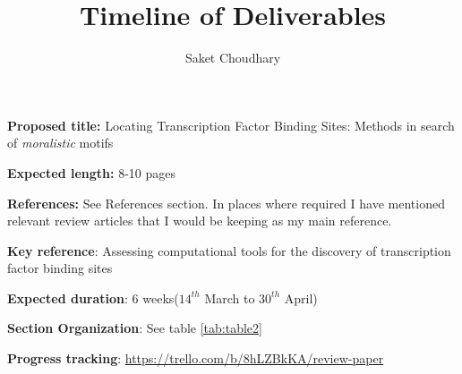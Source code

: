 \documentclass[a4paper,11pt]{article}
\title{Timeline of Deliverables}
\author{Saket Choudhary}
\begin{document}
\maketitle

\textbf{Proposed title:} {Locating Transcription Factor Binding Sites: Methods in search of \textit{moralistic} motifs} 

\textbf{Expected length:} 8-10 pages

\textbf{References: } See References section. In places where required I have mentioned relevant review articles that I would be keeping as my main reference.

\textbf{Key reference}: Assessing computational tools for the
discovery of transcription factor binding sites \cite{tompa_assessing_2005}

\textbf{Expected duration}: 6 weeks($14^{th}$ March to $30^{th}$ April)

\textbf{Section Organization}: See table \ref{tab:table2}

\textbf{Progress tracking}: \url{https://trello.com/b/8hLZBkKA/review-paper} 

\newpage
\end{document}
